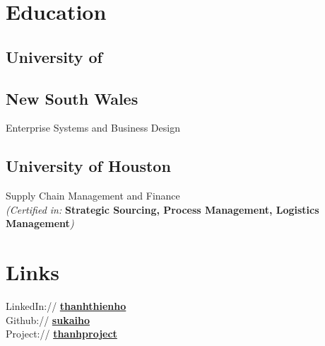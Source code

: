 \documentclass[letterpaper]{deedy-resume} %
\begin{document}
\begin{minipage}[t]{0.33\textwidth} %


\section{Education} 

\subsection{University of}
\subsection{New South Wales}

Enterprise Systems and Business Design\\

\sectionspace %

\subsection{University of Houston}
Supply Chain Management and Finance \\
{\footnotesize {\textit{(Certified in:}\textbf{ Strategic Sourcing, Process Management, Logistics Management}\textit{)}}}\\

\sectionspace %




\section{Links} 

LinkedIn:// \href{https://www.linkedin.com/in/thanhthienho}{\bf thanhthienho} \\
Github:// \href{https://github.com/sukaiho}{\bf sukaiho} \\
Project:// \href{https://drive.google.com/folderview?id=0B7mZbJb-qiSURlYyTkJzQW43aWs&usp=sharing}{\bf thanhproject} \\



\end{minipage}
\end{document}
